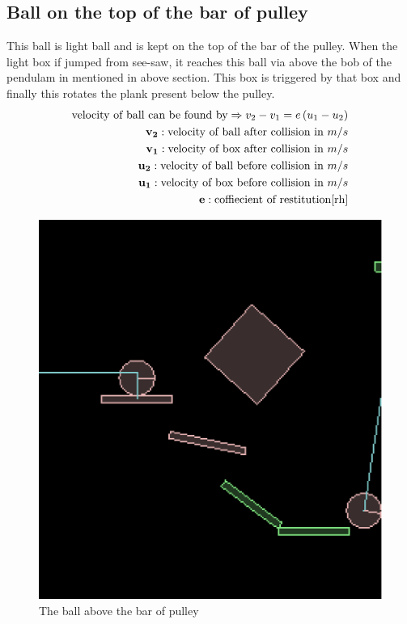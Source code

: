 \documentclass[11pt]{article}
\begin{document}
\subsection{Ball on the top of the bar of pulley}
This ball is light ball and is kept on the top of the bar of the pulley. When the light box if jumped from see-saw, it reaches this
ball via above the bob of the pendulam in mentioned in above section. This box is triggered by that box and finally this rotates
the plank present below the pulley.
\begin{equation}
\begin{split}
\text{velocity of ball can be found by} \Rightarrow v_2 - v_1 = e\left( u_1 - u_2 \right) \\
\mathbf{v_2} : \text{velocity of ball after collision in } m/s\\
\mathbf{v_1} : \text{velocity of box after collision in } m/s\\
\mathbf{u_2} : \text{velocity of ball before collision in } m/s\\
\mathbf{u_1} : \text{velocity of box before collision in } m/s\\
\mathbf{e} : \text{coffiecient of restitution} \cite{rh}\\ 
\end{split}
\end{equation}
\begin{figure}[!ht]
\centering
\includegraphics[scale=0.25]{ball_on_bar}
\caption{The ball above the bar of pulley}
\label{fig2}
\end{figure}
\end{document}
